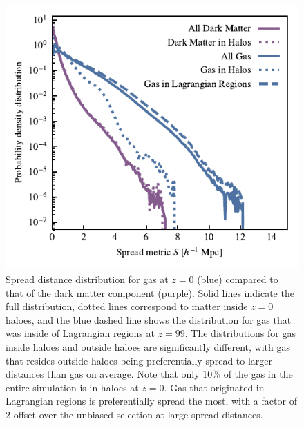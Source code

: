 \begin{figure}
    \centering
    \includegraphics{figures/s50j7kAHF/distance_plot_split_by_component+AHF.pdf}
    \vspace{-0.5cm}
    \caption{Spread distance distribution for gas at $z=0$ (blue) compared to
    that of the dark matter component (purple). Solid lines indicate the full
    distribution, dotted lines correspond to matter inside $z=0$ haloes, and
    the blue dashed line shows the distribution for gas that was inside of
    Lagrangian regions at $z=99$. The distributions for gas inside haloes and
    outside haloes are significantly different, with gas that resides outside
    haloes being preferentially spread to larger distances than gas on
    average. Note that only 10\% of the gas in the entire simulation is in
    haloes at $z=0$. Gas that originated in Lagrangian regions is
    preferentially spread the most, with a factor of 2 offset over the
    unbiased selection at large spread distances.}
    \vspace{-0.5cm}
    \label{fig:distbaryon}
\end{figure}

